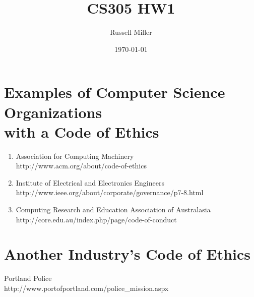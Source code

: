 \documentclass{article}
\title{CS305 HW1}
\author{Russell Miller}
\date{\today}
\begin{document}
\maketitle

\section{Examples of Computer Science Organizations\\ with a Code of Ethics}

\begin{enumerate}
\item Association for Computing Machinery\\
http://www.acm.org/about/code-of-ethics
\item Institute of Electrical and Electronics Engineers\\
http://www.ieee.org/about/corporate/governance/p7-8.html
\item Computing Research and Education Association of Australasia\\
http://core.edu.au/index.php/page/code-of-conduct
\end{enumerate}

\section{Another Industry's Code of Ethics}

Portland Police\\
http://www.portofportland.com/police\_mission.aspx
\end{document}
